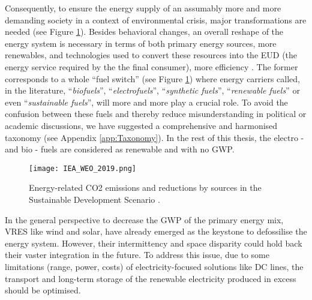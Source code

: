 Consequently, to ensure the energy supply of an assumably more and more demanding society in a context of environmental crisis, major transformations are needed (see Figure \ref{fig:intro:IEA_WEO_2019}). Besides behavioral changes, an overall reshape of the energy system is necessary in terms of both primary energy sources, \ie more renewables, and technologies used to convert these resources into the \gls{EUD} (\ie the energy service required by the the final consumer), \ie more efficiency \cite{iea2020world}. The former corresponds to a whole ``fuel switch'' (see Figure \ref{fig:intro:IEA_WEO_2019}) where energy carriers called, in the literature, ``\emph{biofuels}'', ``\emph{electrofuels}'', ``\emph{synthetic fuels}'', ``\emph{renewable fuels}'' or even ``\emph{sustainable fuels}'', will more and more play a crucial role. To avoid the confusion between these fuels and thereby reduce misunderstanding in political or academic discussions, we have suggested a comprehensive and harmonised taxonomy (see Appendix \ref{app:Taxonomy}). In the rest of this thesis, the electro - and bio - fuels are considered as renewable and with no \gls{GWP}.  

\begin{figure}[ht!]
\centering
\texttt{[image: IEA\_WEO\_2019.png]}
\caption{Energy-related CO2 emissions and reductions by sources in the Sustainable Development Scenario \cite{iea2020world}.}
\label{fig:intro:IEA_WEO_2019}
\end{figure}

In the general perspective to decrease the \gls{GWP} of the primary energy mix, \gls{VRES} like wind and solar, have already emerged as the keystone to defossilise the energy system. However, their intermittency and space disparity could hold back their vaster integration in the future. To address this issue, due to some limitations (\eg range, power, costs) of electricity-focused solutions like \gls{DC} lines, the transport and long-term storage of the renewable electricity produced in excess should be optimised.

